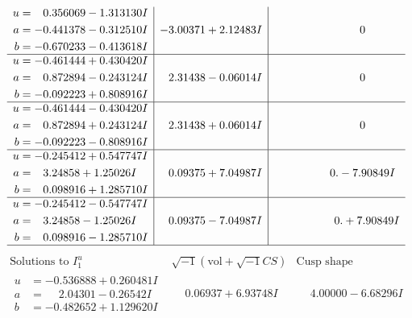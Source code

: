 \documentclass[1p]{elsarticle_modified}
\theoremstyle{definition}
\newcommand{\I}{\sqrt{-1}}
\begin{document}
$$\begin{array}{c|c|c}
\begin{aligned}
u &= \phantom{-}0.356069 - 1.313130 I \\
a &= -0.441378 - 0.312510 I \\
b &= -0.670233 - 0.413618 I\end{aligned}
 & -3.00371 + 2.12483 I & \phantom{-0.000000 } 0 \\ \hline\begin{aligned}
u &= -0.461444 + 0.430420 I \\
a &= \phantom{-}0.872894 - 0.243124 I \\
b &= -0.092223 + 0.808916 I\end{aligned}
 & \phantom{-}2.31438 - 0.06014 I & \phantom{-0.000000 } 0 \\ \hline\begin{aligned}
u &= -0.461444 - 0.430420 I \\
a &= \phantom{-}0.872894 + 0.243124 I \\
b &= -0.092223 - 0.808916 I\end{aligned}
 & \phantom{-}2.31438 + 0.06014 I & \phantom{-0.000000 } 0 \\ \hline\begin{aligned}
u &= -0.245412 + 0.547747 I \\
a &= \phantom{-}3.24858 + 1.25026 I \\
b &= \phantom{-}0.098916 + 1.285710 I\end{aligned}
 & \phantom{-}0.09375 + 7.04987 I & \phantom{-0.000000 } 0. - 7.90849 I \\ \hline\begin{aligned}
u &= -0.245412 - 0.547747 I \\
a &= \phantom{-}3.24858 - 1.25026 I \\
b &= \phantom{-}0.098916 - 1.285710 I\end{aligned}
 & \phantom{-}0.09375 - 7.04987 I & \phantom{-0.000000 -}0. + 7.90849 I\\
 \hline 
 \end{array}$$\newpage$$\begin{array}{c|c|c}  
\text{Solutions to }I^u_{1}& \I (\text{vol} + \sqrt{-1}CS) & \text{Cusp shape}\\
 \hline 
\begin{aligned}
u &= -0.536888 + 0.260481 I \\
a &= \phantom{-}2.04301 - 0.26542 I \\
b &= -0.482652 + 1.129620 I\end{aligned}
 & \phantom{-}0.06937 + 6.93748 I & \phantom{-}4.00000 - 6.68296 I \\ \hline\begin{aligned}

\end{aligned}
\end{array}$$
\end{document}
